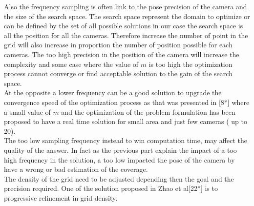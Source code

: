 Also the frequency sampling is often link to the pose precision of the camera and the size of the search space. The search space represent the domain to optimize or can be defined by the set of all possible solutions in our case the search space is all the position for all the cameras. 
Therefore increase the number of point in the grid will also increase in proportion the number of position possible for each cameras. The too high precision in the position of the camera will increase the complexity and some case where the value of $m$ is too high the optimization process cannot converge or find acceptable solution to the gain of the search space. \\ 

At the opposite a lower  frequency can be a good solution to upgrade the convergence speed of the optimization process as that was presented in [8*] where a small value of $m$ and the optimization of the problem formulation has been proposed to have a real time solution for small area and just few cameras ( up to  20).\\

The too low sampling frequency instead to win  computation time, may affect the quality of the answer. In fact as the previous part explain the impact of a too high frequency in the solution, a too low impacted the pose of the camera by have a wrong or bad estimation of the coverage.  \\
The density of the grid need to be adjusted depending then the goal and the precision required. One of the solution proposed in Zhao et al[22*] is to progressive refinement in grid density.

